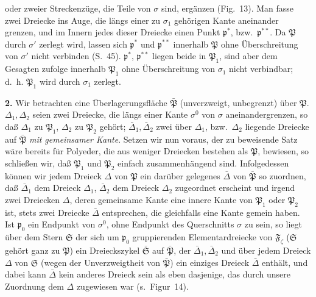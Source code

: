 \documentclass{article}
\begin{document}
oder zweier Streckenzüge, die Teile von $\sigma$ sind, ergänzen (Fig.~13). Man fasse zwei Dreiecke ins Auge, die längs einer zu $\sigma_1$ gehörigen Kante aneinander grenzen, und im Innern jedes dieser Dreiecke einen Punkt $\mathfrak{p}^*$, bzw.\ $\mathfrak{p}^{**}$. Da $\mathfrak{P}$ durch $\sigma'$ zerlegt wird, lassen sich $\mathfrak{p}^*$ und $\mathfrak{p}^{**}$ innerhalb $\mathfrak{P}$ ohne Überschreitung von $\sigma'$ nicht verbinden (S.~45). $\mathfrak{p}^*$, $\mathfrak{p}^{**}$ liegen beide in $\mathfrak{P}_1$, sind aber dem Gesagten zufolge innerhalb $\mathfrak{P}_1$ ohne Überschreitung von $\sigma_1$ nicht verbindbar; d.~h. $\mathfrak{P}_1$ wird durch $\sigma_1$ zerlegt.

\textbf{2.} Wir betrachten eine Überlagerungsfläche $\bar{\mathfrak{P}}$ (unverzweigt, unbegrenzt) über $\mathfrak{P}$. $\Delta_1, \Delta_2$ seien zwei Dreiecke, die längs einer Kante $\sigma^0$ von $\sigma$ aneinandergrenzen, so daß $\Delta_1$ zu $\mathfrak{P}_1$, $\Delta_2$ zu $\mathfrak{P}_2$ gehört; $\bar{\Delta}_1, \bar{\Delta}_2$ zwei über $\Delta_1$, bzw.\ $\Delta_2$ liegende Dreiecke auf $\bar{\mathfrak{P}}$ \emph{mit gemeinsamer Kante}. Setzen wir nun voraus, der zu beweisende Satz wäre bereits für Polyeder, die aus weniger Dreiecken bestehen als $\mathfrak{P}$, bewiesen, so schließen wir, daß $\mathfrak{P}_1$ und $\mathfrak{P}_2$ einfach zusammenhängend sind. Infolgedessen können wir jedem Dreieck $\Delta$ von $\mathfrak{P}$ ein darüber gelegenes $\bar{\Delta}$ von $\bar{\mathfrak{P}}$ so zuordnen, daß $\bar{\Delta}_1$ dem Dreieck $\Delta_1$, $\bar{\Delta}_2$ dem Dreieck $\Delta_2$ zugeordnet erscheint und irgend zwei Dreiecken $\Delta$, deren gemeinsame Kante eine innere Kante von $\mathfrak{P}_1$ oder $\mathfrak{P}_2$ ist, stets zwei Dreiecke $\bar{\Delta}$ entsprechen, die gleichfalls eine Kante gemein haben. Ist $\mathfrak{p}_0$ ein Endpunkt von $\sigma^0$, ohne Endpunkt des Querschnitts $\sigma$ zu sein, so liegt über dem Stern $\mathfrak{S}$ der sich um $\mathfrak{p}_0$ gruppierenden Elementardreiecke von $\mathfrak{F}_\zeta$ ($\mathfrak{S}$ gehört ganz zu $\mathfrak{P}$) ein Dreieckszykel $\bar{\mathfrak{S}}$ auf $\bar{\mathfrak{P}}$, der $\bar{\Delta}_1, \bar{\Delta}_2$ und über jedem Dreieck $\Delta$ von $\mathfrak{S}$ (wegen der Unverzweigtheit von $\bar{\mathfrak{P}}$) ein einziges Dreieck $\bar{\Delta}$ enthält, und dabei kann $\bar{\Delta}$ kein anderes Dreieck sein als eben dasjenige, das durch unsere Zuordnung dem $\Delta$ zugewiesen war (s.\ Figur~14).

\end{document}
